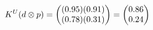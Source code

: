 \documentclass[preview]{standalone}
\begin{document}
\begin{align*}
\special{dvisvgm:raw <g id='unique000'>}K^U(d \otimes p) = \begin{pmatrix} (0.95)(0.91) \\ (0.78)(0.31) \end{pmatrix} = \begin{pmatrix} 0.86 \\ 0.24 \end{pmatrix}\special{dvisvgm:raw </g>}
\end{align*}
\end{document}
